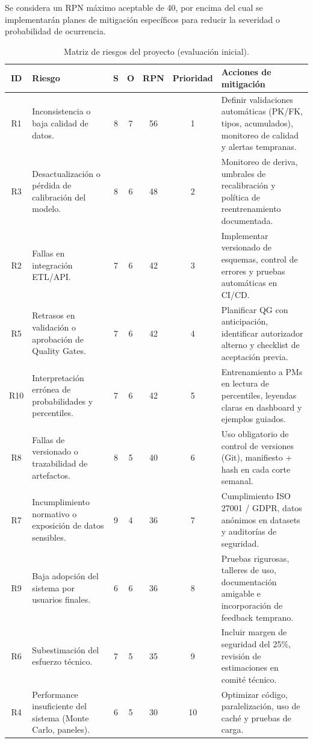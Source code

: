 \documentclass[12pt]
{charter}
\begin{document}
Se considera un RPN máximo aceptable de 40, por encima del cual se implementarán planes de mitigación específicos para reducir la severidad o probabilidad de ocurrencia.

\begin{table}[ht]
\centering
\scriptsize
\caption{Matriz de riesgos del proyecto (evaluación inicial).}
\label{tab:riesgos}
\begin{tabularx}{\textwidth}{cXccccX}
\toprule
\textbf{ID} & \textbf{Riesgo} & \textbf{S} & \textbf{O} & \textbf{RPN} & \textbf{Prioridad} & \textbf{Acciones de mitigación} \\
\midrule
R1 & Inconsistencia o baja calidad de datos. & 8 & 7 & 56 & 1 &
Definir validaciones automáticas (PK/FK, tipos, acumulados), monitoreo de calidad y alertas tempranas. \\
R3 & Desactualización o pérdida de calibración del modelo. & 8 & 6 & 48 & 2 &
Monitoreo de deriva, umbrales de recalibración y política de reentrenamiento documentada. \\
R2 & Fallas en integración ETL/API. & 7 & 6 & 42 & 3 &
Implementar versionado de esquemas, control de errores y pruebas automáticas en CI/CD. \\
R5 & Retrasos en validación o aprobación de Quality Gates. & 7 & 6 & 42 & 4 &
Planificar QG con anticipación, identificar autorizador alterno y checklist de aceptación previa. \\
R10 & Interpretación errónea de probabilidades y percentiles. & 7 & 6 & 42 & 5 &
Entrenamiento a PMs en lectura de percentiles, leyendas claras en dashboard y ejemplos guiados. \\
R8 & Fallas de versionado o trazabilidad de artefactos. & 8 & 5 & 40 & 6 &
Uso obligatorio de control de versiones (Git), manifiesto + hash en cada corte semanal. \\
R7 & Incumplimiento normativo o exposición de datos sensibles. & 9 & 4 & 36 & 7 &
Cumplimiento ISO 27001 / GDPR, datos anónimos en datasets y auditorías de seguridad. \\
R9 & Baja adopción del sistema por usuarios finales. & 6 & 6 & 36 & 8 &
Pruebas rigurosas, talleres de uso, documentación amigable e incorporación de feedback temprano. \\
R6 & Subestimación del esfuerzo técnico. & 7 & 5 & 35 & 9 &
Incluir margen de seguridad del 25\%, revisión de estimaciones en comité técnico. \\
R4 & Performance insuficiente del sistema (Monte Carlo, paneles). & 6 & 5 & 30 & 10 &
Optimizar código, paralelización, uso de caché y pruebas de carga. \\
\bottomrule
\end{tabularx}
\end{table}
\FloatBarrier
\end{document}
